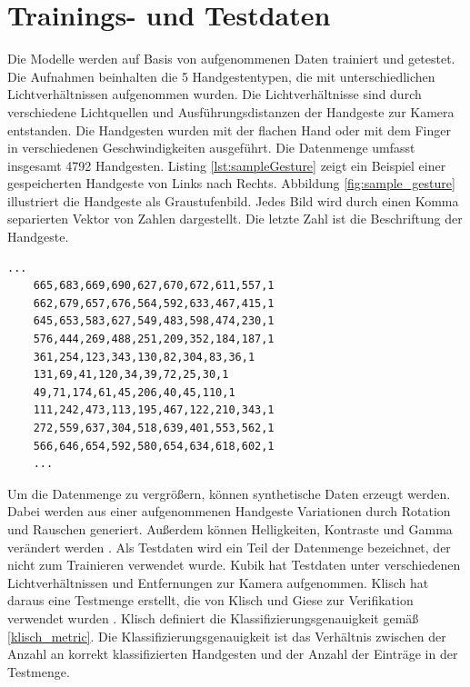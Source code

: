 \section{Trainings- und Testdaten}
\label{sec:synthetischeDaten}
\label{sec:testdaten}
Die Modelle werden auf Basis von aufgenommenen Daten trainiert und getestet. Die Aufnahmen beinhalten die 5 Handgestentypen, die mit unterschiedlichen Lichtverhältnissen aufgenommen wurden. Die Lichtverhältnisse
sind durch verschiedene Lichtquellen und Ausführungsdistanzen der Handgeste zur Kamera entstanden. Die Handgesten wurden mit der flachen Hand oder mit dem Finger in verschiedenen Geschwindigkeiten ausgeführt.
Die Datenmenge umfasst insgesamt 4792 Handgesten.
\newline
\newline
Listing \ref{lst:sampleGesture} zeigt ein Beispiel einer gespeicherten Handgeste von Links nach Rechts. Abbildung \ref{fig:sample_gesture} illustriert die Handgeste als Graustufenbild.
Jedes Bild wird durch einen Komma separierten Vektor von Zahlen dargestellt. Die letzte Zahl ist die Beschriftung der Handgeste.
\begin{lstlisting}[label=lst:sampleGesture,caption={Beispiel einer gespeicherten Handgeste von Links nach Rechts.}]
    ...
    665,683,669,690,627,670,672,611,557,1
    662,679,657,676,564,592,633,467,415,1
    645,653,583,627,549,483,598,474,230,1
    576,444,269,488,251,209,352,184,187,1
    361,254,123,343,130,82,304,83,36,1
    131,69,41,120,34,39,72,25,30,1
    49,71,174,61,45,206,40,45,110,1
    111,242,473,113,195,467,122,210,343,1
    272,559,637,304,518,639,401,553,562,1
    566,646,654,592,580,654,634,618,602,1
    ...
\end{lstlisting}
Um die Datenmenge zu vergrößern, können synthetische Daten erzeugt werden. Dabei werden aus einer aufgenommenen Handgeste Variationen durch Rotation und Rauschen generiert. Außerdem können Helligkeiten,
Kontraste und Gamma verändert werden \cite{venzkeArticle}.
\newline
\newline
Als Testdaten wird ein Teil der Datenmenge bezeichnet, der nicht zum Trainieren verwendet wurde. Kubik hat Testdaten unter verschiedenen Lichtverhältnissen und Entfernungen zur Kamera aufgenommen. Klisch hat
daraus eine Testmenge erstellt, die von Klisch und Giese zur Verifikation verwendet wurden \cite{klischThesis, gieseThesis}. Klisch definiert die Klassifizierungsgenauigkeit gemäß \ref{klisch_metric}. Die
Klassifizierungsgenauigkeit ist das Verhältnis zwischen der Anzahl an korrekt klassifizierten Handgesten und der Anzahl der Einträge in der Testmenge.
